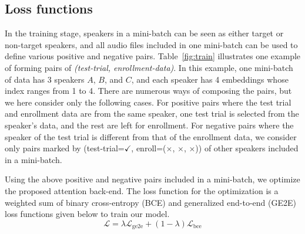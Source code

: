 \documentclass{article}
\newcommand{\PTrial}{$\checkmark$}
\newcommand{\Nenroll}{$\times$}
\begin{document}
\subsection{Loss functions}
\vspace{-1mm}
\label{3.2}

In the training stage, speakers in a mini-batch can be seen as either target or non-target speakers, and all audio files included in one mini-batch can be used to define various positive and negative pairs.  Table~\ref{fig:train} illustrates one example of forming pairs of \textit{(test-trial, enrollment-data)}. In this example, one mini-batch of data has 3 speakers $A$, $B$, and $C$, and each speaker has 4 embeddings whose index ranges from 1 to 4. 
There are numerous ways of composing the pairs, but we here consider only the following cases. 
For positive pairs where the test trial and enrollment data are from the same speaker, one test trial is selected from the speaker's data, and the rest are left for enrollment. 
For negative pairs where the speaker of the test trial is different from that of the enrollment data, we consider only pairs marked by (test-trial=\PTrial, enroll=(\Nenroll, \Nenroll, \Nenroll)) of other speakers included in a mini-batch. 


Using the above positive and negative pairs included in a mini-batch, we optimize the proposed attention back-end. The loss function for the optimization is a weighted sum of binary cross-entropy (BCE) and generalized end-to-end (GE2E) loss \cite{ge2e} functions given below to train our model.
\begin{equation}
\label{loss}
\mathcal{L}=\lambda \mathcal{L}_{\mathrm{ge2e}} + (1-\lambda) \mathcal{L}_{\mathrm{bce}}
\end{equation}
\end{document}
